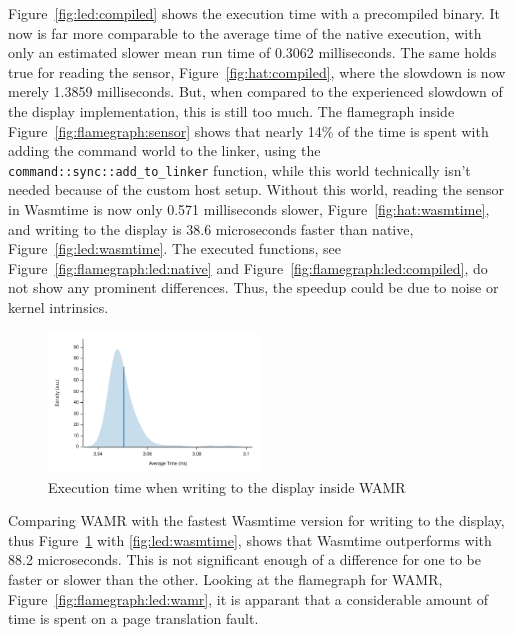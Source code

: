 Figure~\ref{fig:led:compiled} shows the execution time with a precompiled binary. It now is far more comparable to the average time of the native execution, with only an estimated slower mean run time of 0.3062 milliseconds. The same holds true for reading the sensor, Figure~\ref{fig:hat:compiled}, where the slowdown is now merely 1.3859 milliseconds. But, when compared to the experienced slowdown of the display implementation, this is still too much. The flamegraph inside Figure~\ref{fig:flamegraph:sensor} shows that nearly 14\% of the time is spent with adding the command world to the linker, using the \texttt{command::sync::add\_to\_linker} function, while this world technically isn't needed because of the custom host setup. Without this world, reading the sensor in Wasmtime is now only 0.571 milliseconds slower, Figure~\ref{fig:hat:wasmtime}, and writing to the display is 38.6 microseconds faster than native, Figure~\ref{fig:led:wasmtime}. The executed functions, see Figure~\ref{fig:flamegraph:led:native} and Figure~\ref{fig:flamegraph:led:compiled}, do not show any prominent differences. Thus, the speedup could be due to noise or kernel intrinsics.

\begin{figure}[h]
  \centering
  \includegraphics[width=0.5\textwidth]{figures/wamr_led}
  \caption{Execution time when writing to the display inside WAMR}
  \label{fig:led:wamr}
\end{figure}

\newpage

Comparing WAMR with the fastest Wasmtime version for writing to the display, thus Figure~\ref{fig:led:wamr} with \ref{fig:led:wasmtime}, shows that Wasmtime outperforms with 88.2 microseconds. This is not significant enough of a difference for one to be faster or slower than the other. Looking at the flamegraph for WAMR, Figure~\ref{fig:flamegraph:led:wamr}, it is apparant that a considerable amount of time is spent on a page translation fault. 

